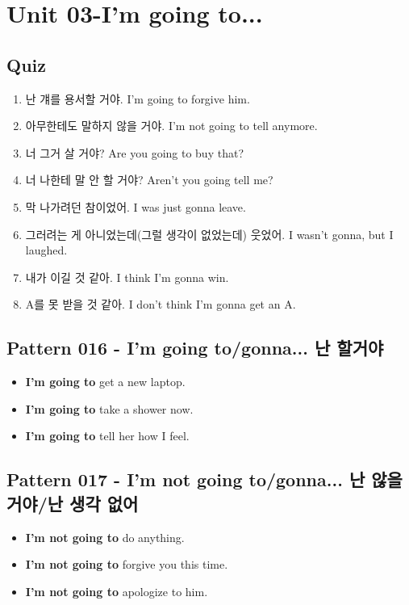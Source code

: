 \documentclass[11pt]{oblivoir}
\begin{document}
\section{Unit 03-I'm going to...}
\subsection{Quiz}
\begin{enumerate}
  \color{black} \item 난 걔를 용서할 거야.
    \color{light-gray} I'm going to forgive him.
  \color{black} \item 아무한테도 말하지 않을 거야.
    \color{light-gray} I'm not going to tell anymore.
  \color{black} \item 너 그거 살 거야?
    \color{light-gray} Are you going to buy that?
  \color{black} \item 너 나한테 말 안 할 거야?
    \color{light-gray} Aren't you going tell me?
  \color{black} \item 막 나가려던 참이었어.
    \color{light-gray} I was just gonna leave.
  \color{black} \item 그러려는 게 아니었는데(그럴 생각이 없었는데) 웃었어.
    \color{light-gray} I wasn't gonna, but I laughed.
  \color{black} \item 내가 이길 것 같아.
    \color{light-gray} I think I'm gonna win.
  \color{black} \item A를 못 받을 것 같아.
    \color{light-gray} I don't think I'm gonna get an A.
\end{enumerate}

\subsection{Pattern 016 - I'm going to/gonna... 난 \texttildelow 할거야}
\begin{itemize}
  \item \textbf{I'm going to} get a new laptop.
  \item \textbf{I'm going to} take a shower now.
  \item \textbf{I'm going to} tell her how I feel.
\end{itemize}

\subsection{Pattern 017 - I'm not going to/gonna... 난  않을 거야/난  생각 없어}
\begin{itemize}
  \item \textbf{I'm not going to} do anything.
  \item \textbf{I'm not going to} forgive you this time.
  \item \textbf{I'm not going to} apologize to him.
\end{itemize}
\end{document}
